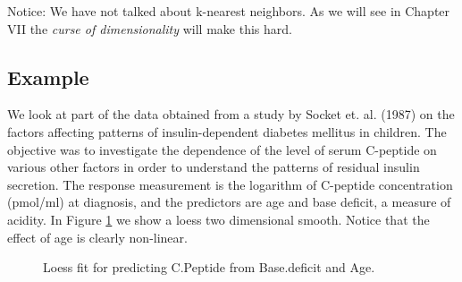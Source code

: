 Notice: We have not talked about k-nearest neighbors. As we will see in
Chapter VII the {\it curse of dimensionality} will make this hard.

\subsection{Example}
We look at part of the data obtained from a study by Socket
et. al. (1987) on
the factors affecting patterns of insulin-dependent diabetes mellitus
in children. The objective was to investigate the dependence of the
level of serum C-peptide on various other factors in order to
understand the patterns of residual insulin secretion. The response
measurement is the logarithm of C-peptide concentration (pmol/ml) at
diagnosis, and the predictors are age and base deficit, a measure of
acidity. In Figure \ref{f3.5} we show a loess two dimensional
smooth. Notice that the effect of age is clearly non-linear.

\begin{figure}[htp]
\caption{\label{f3.5} Loess fit for predicting C.Peptide from  Base.deficit and Age.}
\centerline{}
\end{figure}


